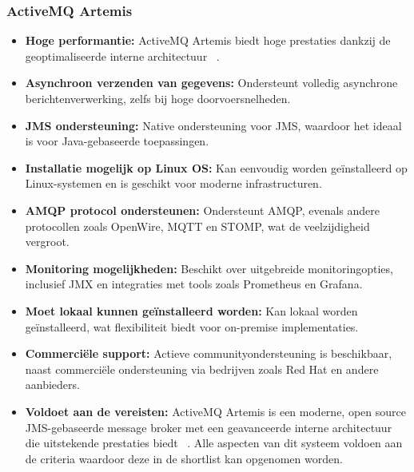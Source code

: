 \subsubsection{ActiveMQ Artemis}
\begin{itemize}
    \item \textbf{Hoge performantie:} ActiveMQ Artemis biedt hoge prestaties dankzij de geoptimaliseerde interne architectuur ~\autocite{JustinReock2023}.
    \item \textbf{Asynchroon verzenden van gegevens:} Ondersteunt volledig asynchrone berichtenverwerking, zelfs bij hoge doorvoersnelheden.
    \item \textbf{JMS ondersteuning:} Native ondersteuning voor JMS, waardoor het ideaal is voor Java-gebaseerde toepassingen.
    \item \textbf{Installatie mogelijk op Linux OS:} Kan eenvoudig worden geïnstalleerd op Linux-systemen en is geschikt voor moderne infrastructuren.
    \item \textbf{AMQP protocol ondersteunen:} Ondersteunt AMQP, evenals andere protocollen zoals OpenWire, MQTT en STOMP, wat de veelzijdigheid vergroot.
    \item \textbf{Monitoring mogelijkheden:} Beschikt over uitgebreide monitoringopties, inclusief JMX en integraties met tools zoals Prometheus en Grafana.
    \item \textbf{Moet lokaal kunnen geïnstalleerd worden:} Kan lokaal worden geïnstalleerd, wat flexibiliteit biedt voor on-premise implementaties.
    \item \textbf{Commerciële support:} Actieve communityondersteuning is beschikbaar, naast commerciële ondersteuning via bedrijven zoals Red Hat en andere aanbieders.
    \item \textbf{Voldoet aan de vereisten:}
    ActiveMQ Artemis is een moderne, open source JMS-gebaseerde message broker met een geavanceerde interne architectuur die uitstekende prestaties biedt ~\autocite{JustinReock2023}.
    Alle aspecten van dit systeem voldoen aan de criteria waardoor deze in de shortlist kan opgenomen worden.
\end{itemize}
 
 

